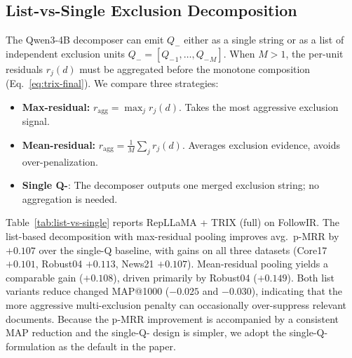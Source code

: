 \documentclass[letterpaper]{article}
\newcommand{\method}{\ifmmode \mathrm{TRIX}\else TRIX\xspace\fi}
\newcommand{\qminus}{Q_{-}}
\begin{document}
\subsection{List-vs-Single Exclusion Decomposition}
\label{app:list-vs-single}

The Qwen3-4B decomposer can emit $\qminus$ either as a single string or as a list of independent exclusion units
$\qminus = [{\qminus}_1, \dots, {\qminus}_M]$.  When $M > 1$,
the per-unit residuals $r_j(d)$ must be aggregated before the monotone
composition (Eq.~\ref{eq:trix-final}).  We compare three strategies:

\begin{itemize}\setlength{\itemsep}{1pt}
  \item \textbf{Max-residual:} $r_{\mathrm{agg}} = \max_j r_j(d)$.
        Takes the most aggressive exclusion signal.
  \item \textbf{Mean-residual:} $r_{\mathrm{agg}} = \frac{1}{M}\sum_j r_j(d)$.
        Averages exclusion evidence, avoids over-penalization.
  \item \textbf{Single Q-}: The decomposer outputs one merged
        exclusion string; no aggregation is needed.
\end{itemize}

Table~\ref{tab:list-vs-single} reports RepLLaMA + \method{} (full)
on FollowIR.  The list-based decomposition with max-residual pooling
improves avg.\ p-MRR by $+0.107$ over the single-Q baseline,
with gains on all three datasets (Core17 $+0.101$, Robust04 $+0.113$,
News21 $+0.107$).  Mean-residual pooling yields a comparable
gain ($+0.108$), driven primarily by Robust04 ($+0.149$).
Both list variants reduce changed MAP@1000
($-0.025$ and $-0.030$), indicating that the more aggressive multi-exclusion
penalty can occasionally over-suppress relevant documents.  Because the
p-MRR improvement is accompanied by a consistent MAP reduction and the
single-Q- design is simpler, we adopt the single-Q- formulation as the
default in the paper.
\end{document}
